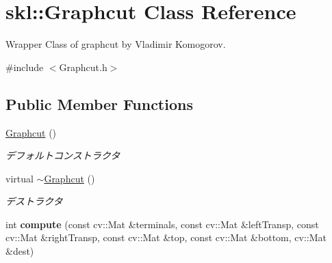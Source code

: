 \hypertarget{classskl_1_1_graphcut}{}\section{skl\+:\+:Graphcut Class Reference}
\label{classskl_1_1_graphcut}


Wrapper Class of graphcut by Vladimir Komogorov.  




{\ttfamily \#include $<$Graphcut.\+h$>$}

\subsection*{Public Member Functions}
\begin{DoxyCompactItemize}
\item 
\hypertarget{classskl_1_1_graphcut_a1a784d4591dfd733eee7f172f56ae23b}{}\label{classskl_1_1_graphcut_a1a784d4591dfd733eee7f172f56ae23b} 
\hyperlink{classskl_1_1_graphcut_a1a784d4591dfd733eee7f172f56ae23b}{Graphcut} ()
\begin{DoxyCompactList}\small\item\em デフォルトコンストラクタ \end{DoxyCompactList}\item 
\hypertarget{classskl_1_1_graphcut_aadfc7d0fea926aac3e88be1930239adb}{}\label{classskl_1_1_graphcut_aadfc7d0fea926aac3e88be1930239adb} 
virtual \hyperlink{classskl_1_1_graphcut_aadfc7d0fea926aac3e88be1930239adb}{$\sim$\+Graphcut} ()
\begin{DoxyCompactList}\small\item\em デストラクタ \end{DoxyCompactList}\item 
\hypertarget{classskl_1_1_graphcut_add5ffe56f886d143450050e2fe1a6ae8}{}\label{classskl_1_1_graphcut_add5ffe56f886d143450050e2fe1a6ae8} 
int {\bfseries compute} (const cv\+::\+Mat \&terminals, const cv\+::\+Mat \&left\+Transp, const cv\+::\+Mat \&right\+Transp, const cv\+::\+Mat \&top, const cv\+::\+Mat \&bottom, cv\+::\+Mat \&dest)
\end{DoxyCompactItemize}
